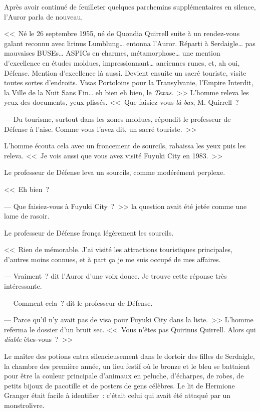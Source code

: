 Après avoir continué de feuilleter quelques parchemins supplémentaires en silence, l'Auror parla de nouveau.

<<~Né le 26 septembre 1955, né de Quondia Quirrell suite à un rendez-vous galant reconnu avec lirinus Lumblung… entonna l'Auror. Réparti à Serdaigle… pas mauvaises BUSEs… ASPICs en charmes, métamorphose… une mention d'excellence en études moldues, impressionnant… anciennes runes, et, ah oui, Défense. Mention d'excellence là aussi. Devient ensuite un sacré touriste, visite toutes sortes d'endroits. Visas Portoloins pour la Transylvanie, l'Empire Interdit, la Ville de la Nuit Sans Fin… eh bien eh bien, le \emph{Texas}.~>> L'homme releva les yeux des documents, yeux plissés. <<~Que faisiez-vous \emph{là-bas}, M. Quirrell~?

--- Du tourisme, surtout dans les zones moldues, répondit le professeur de Défense à l'aise. Comme vous l'avez dit, un sacré touriste.~>>

L'homme écouta cela avec un froncement de sourcils, rabaissa les yeux puis les releva. <<~Je vois aussi que vous avez visité Fuyuki City en 1983.~>>

Le professeur de Défense leva un sourcils, comme modérément perplexe.

<<~Eh bien~?

--- Que faisiez-vous à Fuyuki City~?~>> la question avait été jetée comme une lame de rasoir.

Le professeur de Défense fronça légèrement les sourcils.

<<~Rien de mémorable. J'ai visité les attractions touristiques principales, d'autres moins connues, et à part ça je me suis occupé de mes affaires.

--- Vraiment~? dit l'Auror d'une voix douce. Je trouve cette réponse très intéressante.

--- Comment cela~? dit le professeur de Défense.

--- Parce qu'il n'y avait pas de visa pour Fuyuki City dans la liste.~>> L'homme referma le dossier d'un bruit sec. <<~Vous n'êtes pas Quirinus Quirrell. Alors qui \emph{diable} êtes-vous~?~>>

\later

Le maître des potions entra silencieusement dans le dortoir des filles de Serdaigle, la chambre des première année, un lieu festif où le bronze et le bleu se battaient pour être la couleur principale d'animaux en peluche, d'écharpes, de robes, de petits bijoux de pacotille et de posters de gens célèbres. Le lit de Hermione Granger était facile à identifier~: c'était celui qui avait été attaqué par un monstrolivre.

